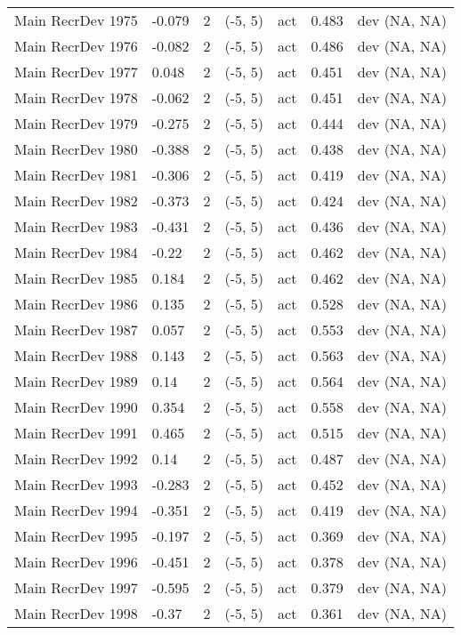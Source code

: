 \documentclass[11pt,
  english,
  letterpaper,
]{article}
\begin{document}
\begin{landscape}
\begin{longtable}[t]{>{\raggedright\arraybackslash}p{7.5cm}lllll>{\raggedright\arraybackslash}p{3.5cm}}
Main RecrDev 1975 & -0.079 & 2 & (-5, 5) & act & 0.483 & dev (NA, NA)\\
Main RecrDev 1976 & -0.082 & 2 & (-5, 5) & act & 0.486 & dev (NA, NA)\\
Main RecrDev 1977 & 0.048 & 2 & (-5, 5) & act & 0.451 & dev (NA, NA)\\
Main RecrDev 1978 & -0.062 & 2 & (-5, 5) & act & 0.451 & dev (NA, NA)\\
Main RecrDev 1979 & -0.275 & 2 & (-5, 5) & act & 0.444 & dev (NA, NA)\\
Main RecrDev 1980 & -0.388 & 2 & (-5, 5) & act & 0.438 & dev (NA, NA)\\
Main RecrDev 1981 & -0.306 & 2 & (-5, 5) & act & 0.419 & dev (NA, NA)\\
Main RecrDev 1982 & -0.373 & 2 & (-5, 5) & act & 0.424 & dev (NA, NA)\\
Main RecrDev 1983 & -0.431 & 2 & (-5, 5) & act & 0.436 & dev (NA, NA)\\
Main RecrDev 1984 & -0.22 & 2 & (-5, 5) & act & 0.462 & dev (NA, NA)\\
Main RecrDev 1985 & 0.184 & 2 & (-5, 5) & act & 0.462 & dev (NA, NA)\\
Main RecrDev 1986 & 0.135 & 2 & (-5, 5) & act & 0.528 & dev (NA, NA)\\
Main RecrDev 1987 & 0.057 & 2 & (-5, 5) & act & 0.553 & dev (NA, NA)\\
Main RecrDev 1988 & 0.143 & 2 & (-5, 5) & act & 0.563 & dev (NA, NA)\\
Main RecrDev 1989 & 0.14 & 2 & (-5, 5) & act & 0.564 & dev (NA, NA)\\
Main RecrDev 1990 & 0.354 & 2 & (-5, 5) & act & 0.558 & dev (NA, NA)\\
Main RecrDev 1991 & 0.465 & 2 & (-5, 5) & act & 0.515 & dev (NA, NA)\\
Main RecrDev 1992 & 0.14 & 2 & (-5, 5) & act & 0.487 & dev (NA, NA)\\
Main RecrDev 1993 & -0.283 & 2 & (-5, 5) & act & 0.452 & dev (NA, NA)\\
Main RecrDev 1994 & -0.351 & 2 & (-5, 5) & act & 0.419 & dev (NA, NA)\\
Main RecrDev 1995 & -0.197 & 2 & (-5, 5) & act & 0.369 & dev (NA, NA)\\
Main RecrDev 1996 & -0.451 & 2 & (-5, 5) & act & 0.378 & dev (NA, NA)\\
Main RecrDev 1997 & -0.595 & 2 & (-5, 5) & act & 0.379 & dev (NA, NA)\\
Main RecrDev 1998 & -0.37 & 2 & (-5, 5) & act & 0.361 & dev (NA, NA)\\

\end{longtable}
\end{landscape}
\end{document}
